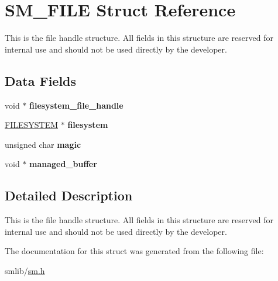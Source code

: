 \hypertarget{struct_s_m___f_i_l_e}{\section{S\-M\-\_\-\-F\-I\-L\-E Struct Reference}
\label{struct_s_m___f_i_l_e}
}


This is the file handle structure. All fields in this structure are reserved for internal use and should not be used directly by the developer.  


\subsection*{Data Fields}
\begin{DoxyCompactItemize}
\item 
\hypertarget{struct_s_m___f_i_l_e_a05f9f25da7ef855f2d8179ad3198e703}{void $\ast$ {\bfseries filesystem\-\_\-file\-\_\-handle}}\label{struct_s_m___f_i_l_e_a05f9f25da7ef855f2d8179ad3198e703}

\item 
\hypertarget{struct_s_m___f_i_l_e_a6a46adc5088d43fcc8e2cf969c87eed4}{\hyperlink{struct_f_i_l_e_s_y_s_t_e_m}{F\-I\-L\-E\-S\-Y\-S\-T\-E\-M} $\ast$ {\bfseries filesystem}}\label{struct_s_m___f_i_l_e_a6a46adc5088d43fcc8e2cf969c87eed4}

\item 
\hypertarget{struct_s_m___f_i_l_e_aadfd02381bdf6fdfcdad8c1b7adc38d4}{unsigned char {\bfseries magic}}\label{struct_s_m___f_i_l_e_aadfd02381bdf6fdfcdad8c1b7adc38d4}

\item 
\hypertarget{struct_s_m___f_i_l_e_a1cc54df4209e5a935eb8a889fc827017}{void $\ast$ {\bfseries managed\-\_\-buffer}}\label{struct_s_m___f_i_l_e_a1cc54df4209e5a935eb8a889fc827017}

\end{DoxyCompactItemize}


\subsection{Detailed Description}
This is the file handle structure. All fields in this structure are reserved for internal use and should not be used directly by the developer. 

The documentation for this struct was generated from the following file\-:\begin{DoxyCompactItemize}
\item 
smlib/\hyperlink{sm_8h}{sm.\-h}\end{DoxyCompactItemize}
